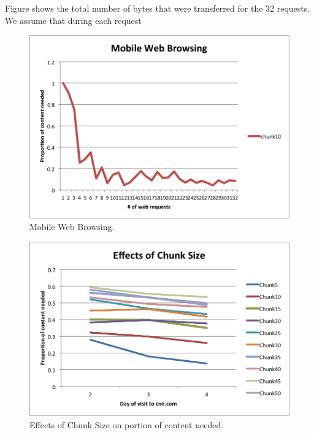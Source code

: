 Figure shows the total number of bytes that were transferred for the 32 requests. We assume that during each request

\begin{figure}[h] 
\centering \includegraphics[scale=0.40]{images/browsing.png}
\caption{Mobile Web Browsing.}
\label{fig:mobsim_ui}
\end{figure}

\begin{figure}[h] 
\centering \includegraphics[scale=0.40]{images/chunksize.png}
\caption{Effects of Chunk Size on portion of content needed.}
\label{fig:mobsim_ui}
\end{figure}

